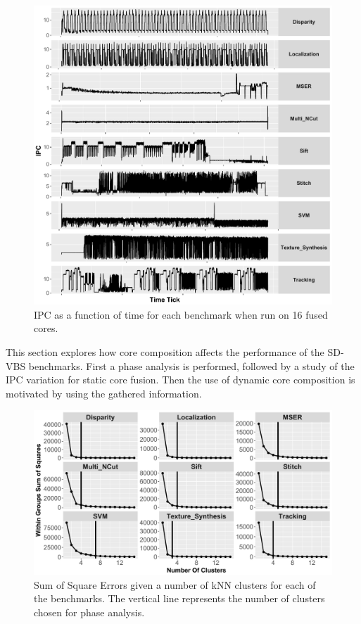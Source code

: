 
\begin{figure}[t]
    \centering
    \includegraphics[width=1\textwidth]{cases-paper/graphics/Exploration/ipcs_16_3.pdf}
    \caption{IPC as a function of time for each benchmark when run on 16 fused cores.}
    \label{fig:sxt}
	\vspace{1em}
\end{figure}

This section explores how core composition affects the performance of the SD-VBS benchmarks.
First a phase analysis is performed, followed by a study of the IPC variation for static core fusion.
Then the use of dynamic core composition is motivated by using the gathered information.
\begin{figure}[t]
    \centering
    \includegraphics[width=1\textwidth]{cases-paper/graphics/Exploration/SSE_final.pdf}
    \caption{Sum of Square Errors given a number of kNN clusters for each of the benchmarks. The vertical line represents the number of clusters chosen for phase analysis.}
    \label{fig:sse}
		\vspace{1em}
\end{figure}

